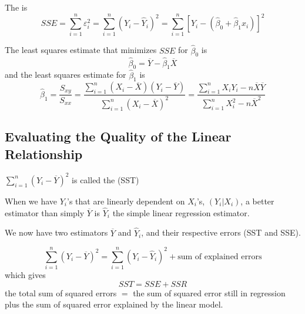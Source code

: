 \documentclass[12pt, a4paper, twoside, openright, titlepage]{book}
\begin{document}
\begin{defn}{}{}
    The  is \begin{equation*}
        SSE = \sum_{i=1}^n\varepsilon_i^2 = \sum_{i=1}^n(Y_i-\hat{Y}_i)^2 = \sum_{i=1}^n[Y_i - (\hat{\beta}_0 + \hat{\beta}_1x_i)]^2
    \end{equation*}
\end{defn}

\begin{claim}{}{}
    The least squares estimate that minimizes $SSE$ for $\hat{\beta}_0$ is \begin{equation*}
        \boxed{\hat{\beta}_0 = \overline{Y} - \hat{\beta}_1\overline{X}}
    \end{equation*}
    and the least squares estimate for $\hat{\beta}_1$ is \begin{equation*}
        \boxed{\hat{\beta}_1 = \frac{S_{xy}}{S_{xx}} = \frac{\sum_{i=1}^n(X_i-\overline{X})(Y_i-\overline{Y})}{\sum_{i=1}^n(X_i-\overline{X})^2} = \frac{\sum_{i=1}^nX_iY_i - n\overline{X}\overline{Y}}{\sum_{i=1}^nX_i^2 - n\overline{X}^2}}
    \end{equation*}
\end{claim}


\subsection{Evaluating the Quality of the Linear Relationship}


\begin{defn}{}{}
    $\sum_{i=1}^n(Y_i -\overline{Y})^2$ is called the  (SST)
\end{defn}

\begin{rmk}{}{}
    When we have $Y_i$'s that are linearly dependent on $X_i$'s, $(Y_i\vert X_i)$, a better estimator than simply $\overline{Y}$ is $\hat{Y}_i$ the simple linear regression estimator.
\end{rmk}

We now have two estimators $\overline{Y}$ and $\hat{Y}_i$, and their respective errors (SST and SSE).

\begin{rmk}{}{}
    \begin{equation*}
        \sum_{i=1}^n(Y_i-\overline{Y})^2 = \sum_{i=1}^n(Y_i-\hat{Y}_i)^2 + \text{sum of explained errors}
    \end{equation*}
    which gives \begin{equation*}
        SST = SSE + SSR
    \end{equation*}
    the total sum of squared errors $=$ the sum of squared error still in regression plus the sum of squared error explained by the linear model.
\end{rmk}
\end{document}
